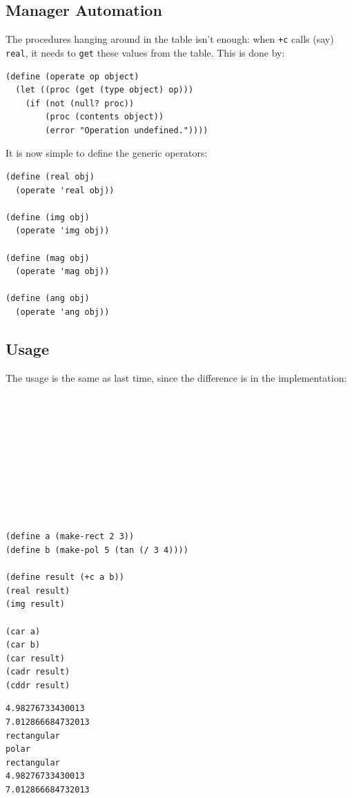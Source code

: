 \documentclass[9pt]{report}
\begin{document}
\subsection{Manager Automation}
\label{sec:org736d34e}

The procedures hanging around in the table isn't enough: when \texttt{+c}
calls (say) \texttt{real}, it needs to \texttt{get} these values from the table.
This is done by:

\begin{verbatim}
(define (operate op object)
  (let ((proc (get (type object) op)))
    (if (not (null? proc))
        (proc (contents object))
        (error "Operation undefined."))))
\end{verbatim}

It is now simple to define the generic operators:

\begin{verbatim}
(define (real obj)
  (operate 'real obj))

(define (img obj)
  (operate 'img obj))

(define (mag obj)
  (operate 'mag obj))

(define (ang obj)
  (operate 'ang obj))
\end{verbatim}


\subsection{Usage}
\label{sec:org187a487}

The usage is the same as last time, since the difference is in the
implementation:

\begin{verbatim}










(define a (make-rect 2 3))
(define b (make-pol 5 (tan (/ 3 4))))

(define result (+c a b))
(real result)
(img result)

(car a)
(car b)
(car result)
(cadr result)
(cddr result)

\end{verbatim}

\begin{verbatim}
4.98276733430013
7.012866684732013
rectangular
polar
rectangular
4.98276733430013
7.012866684732013
\end{verbatim}
\end{document}
